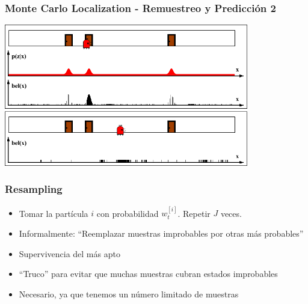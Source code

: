 \begin{frame}
    \frametitle{Monte Carlo Localization - Remuestreo y Predicción 2}

    \begin{center}
        \includegraphics[width=0.8\textwidth]{./images/particle_filter/monte_carlo_resample_and_predict2.pdf}
    \end{center}

\end{frame}


\begin{frame}
    \frametitle{Resampling}
    \begin{itemize}
        \item Tomar la partícula $i$ con probabilidad $w_t^{[i]}$. Repetir $J$ veces.
        \item Informalmente: ``Reemplazar muestras improbables por otras más probables''
        \item Supervivencia del más apto
        \item ``Truco'' para evitar que muchas muestras cubran estados improbables
        \item Necesario, ya que tenemos un número limitado de muestras
    \end{itemize}
\end{frame}
    
